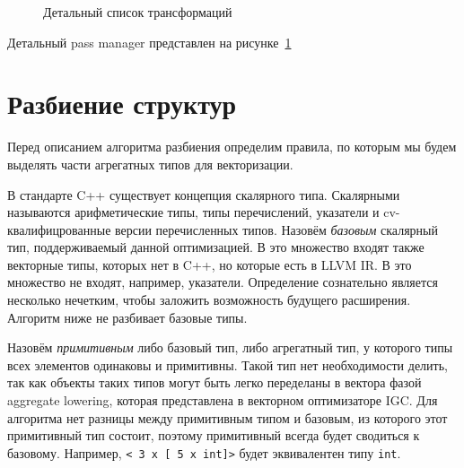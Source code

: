 \begin{figure}[ht]
    \caption{Детальный список трансформаций}\label{fig:passmgr}
\end{figure}

Детальный pass manager представлен на рисунке~\cref{fig:passmgr}

\section{Разбиение структур}\label{sec:lowering/splitter}

Перед описанием алгоритма разбиения определим правила, по которым мы будем выделять части агрегатных типов для векторизации.

В стандарте C++ существует концепция скалярного типа.
Скалярными называются арифметические типы, типы перечислений, указатели и cv-квалифицрованные версии перечисленных типов.
Назовём \emph{базовым} скалярный тип, поддерживаемый данной оптимизацией.
В это множество входят также векторные типы, которых нет в C++, но которые есть в LLVM IR. 
В это множество не входят, например, указатели.
Определение сознательно является несколько нечетким, чтобы заложить возможность будущего расширения.
Алгоритм ниже не разбивает базовые типы.

Назовём \emph{примитивным} либо базовый тип, либо агрегатный тип, у которого типы всех элементов одинаковы и примитивны.
Такой тип нет необходимости делить, так как объекты таких типов могут быть легко переделаны в вектора фазой aggregate lowering, которая представлена в векторном оптимизаторе IGC.
Для алгоритма нет разницы между примитивным типом и базовым, из которого этот примитивный тип состоит, поэтому примитивный всегда будет сводиться к базовому. Например, \verb|< 3 x [ 5 x int]>| будет эквивалентен типу \verb|int|.

